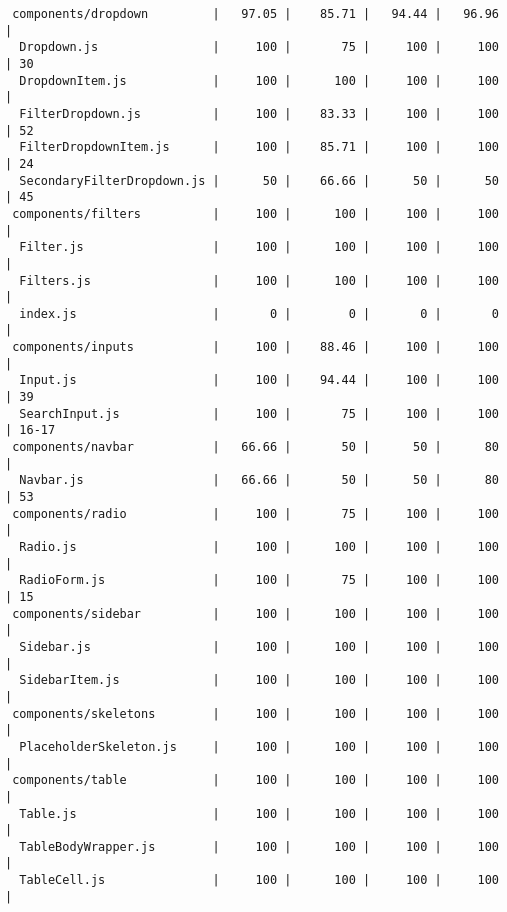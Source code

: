 \documentclass[12pt, titlepage]{article}
\begin{document}
\begin{scriptsize}
\begin{verbatim}
 components/dropdown         |   97.05 |    85.71 |   94.44 |   96.96 |                          
  Dropdown.js                |     100 |       75 |     100 |     100 | 30                       
  DropdownItem.js            |     100 |      100 |     100 |     100 |                          
  FilterDropdown.js          |     100 |    83.33 |     100 |     100 | 52                       
  FilterDropdownItem.js      |     100 |    85.71 |     100 |     100 | 24                       
  SecondaryFilterDropdown.js |      50 |    66.66 |      50 |      50 | 45                       
 components/filters          |     100 |      100 |     100 |     100 |                          
  Filter.js                  |     100 |      100 |     100 |     100 |                          
  Filters.js                 |     100 |      100 |     100 |     100 |                          
  index.js                   |       0 |        0 |       0 |       0 |                          
 components/inputs           |     100 |    88.46 |     100 |     100 |                          
  Input.js                   |     100 |    94.44 |     100 |     100 | 39                       
  SearchInput.js             |     100 |       75 |     100 |     100 | 16-17                    
 components/navbar           |   66.66 |       50 |      50 |      80 |                          
  Navbar.js                  |   66.66 |       50 |      50 |      80 | 53                       
 components/radio            |     100 |       75 |     100 |     100 |                          
  Radio.js                   |     100 |      100 |     100 |     100 |                          
  RadioForm.js               |     100 |       75 |     100 |     100 | 15                       
 components/sidebar          |     100 |      100 |     100 |     100 |                          
  Sidebar.js                 |     100 |      100 |     100 |     100 |                          
  SidebarItem.js             |     100 |      100 |     100 |     100 |                          
 components/skeletons        |     100 |      100 |     100 |     100 |                          
  PlaceholderSkeleton.js     |     100 |      100 |     100 |     100 |                          
 components/table            |     100 |      100 |     100 |     100 |                          
  Table.js                   |     100 |      100 |     100 |     100 |                          
  TableBodyWrapper.js        |     100 |      100 |     100 |     100 |                          
  TableCell.js               |     100 |      100 |     100 |     100 |                          

\end{verbatim}
\end{scriptsize}
\end{document}
